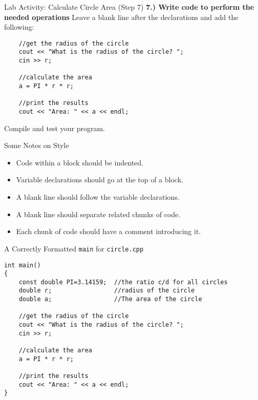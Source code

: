 \documentclass[]{beamer}
\begin{document}
\begin{frame}[fragile]{Lab Activity: Calculate Circle Area (Step 7)}
    \textbf{7.) Write code to perform the needed operations}
    \newline Leave a blank line after the declarations and add the
    following:
    \newline\newline
    \begin{BVerbatim}
    //get the radius of the circle
    cout << "What is the radius of the circle? ";
    cin >> r;

    //calculate the area
    a = PI * r * r;

    //print the results
    cout << "Area: " << a << endl;
    \end{BVerbatim}
    \newline\newline
    Compile and test your program.
\end{frame}

\begin{frame}{Some Notes on Style}
    \begin{itemize}[<+->]
        \item Code within a block should be indented.
        \item Variable declarations should go at the top of a block.
        \item A blank line should follow the variable declarations.
        \item A blank line should separate related chunks of code.
        \item Each chunk of code should have a comment introducing it.
    \end{itemize}
\end{frame}

\begin{frame}[fragile]{A Correctly Formatted \texttt{main} for \texttt{circle.cpp}}
\begin{adjustbox}{max width=0.95\textwidth, max height=0.9\textheight}
\begin{BVerbatim}
int main()
{
    const double PI=3.14159;  //the ratio c/d for all circles
    double r;                 //radius of the circle
    double a;                 //The area of the circle

    //get the radius of the circle
    cout << "What is the radius of the circle? ";
    cin >> r;

    //calculate the area
    a = PI * r * r;

    //print the results
    cout << "Area: " << a << endl;
}
\end{BVerbatim}
\end{adjustbox}
\end{frame}
\end{document}
